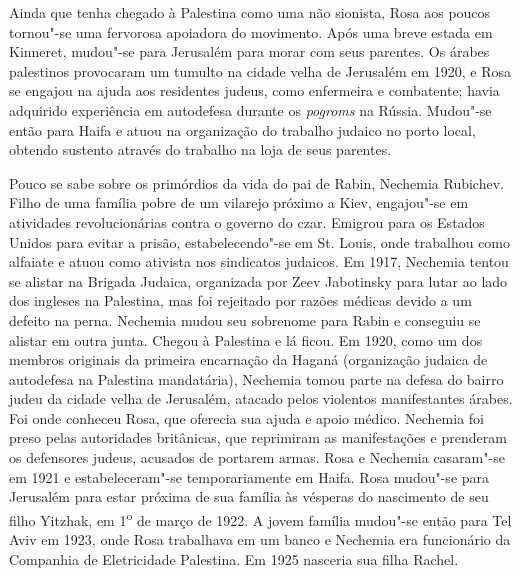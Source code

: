 Ainda que tenha chegado à Palestina como uma não sionista, Rosa aos
poucos tornou"-se uma fervorosa apoiadora do movimento. Após uma breve
estada em Kinneret, mudou"-se para Jerusalém para morar com seus
parentes. Os árabes palestinos provocaram um tumulto na cidade velha de
Jerusalém em 1920, e Rosa se engajou na ajuda aos residentes judeus, como
enfermeira e combatente; havia adquirido experiência em autodefesa
durante os \textit{pogroms} na Rússia. Mudou"-se então para Haifa e atuou
na organização do trabalho judaico no porto local, obtendo sustento
através do trabalho na loja de seus parentes.

Pouco se sabe sobre os primórdios da vida do pai de Rabin, Nechemia
Rubichev. Filho de uma família pobre de um vilarejo próximo a Kiev,
engajou"-se em atividades revolucionárias contra o governo do czar.
Emigrou para os Estados Unidos para evitar a prisão, estabelecendo"-se em
St. Louis, onde trabalhou como alfaiate e atuou como ativista nos
sindicatos judaicos. Em 1917, Nechemia tentou se alistar na Brigada
Judaica, organizada por Zeev Jabotinsky para lutar ao lado dos
ingleses na Palestina, mas foi rejeitado por razões médicas devido a um
defeito na perna. Nechemia mudou seu sobrenome para Rabin e conseguiu
se alistar em outra junta. Chegou à Palestina e lá ficou. Em 1920, como
um dos membros originais da primeira encarnação da Haganá (organização
judaica de autodefesa na Palestina mandatária), Nechemia tomou parte na
defesa do bairro judeu da cidade velha de Jerusalém, atacado pelos
violentos manifestantes árabes. Foi onde conheceu Rosa, que
oferecia sua ajuda e apoio médico. Nechemia foi preso pelas autoridades
britânicas, que reprimiram as manifestações e prenderam os defensores
judeus, acusados de portarem armas. Rosa e Nechemia casaram"-se em 1921 e
estabeleceram"-se temporariamente em Haifa. Rosa mudou"-se para Jerusalém
para estar próxima de sua família às vésperas do nascimento de seu filho
Yitzhak, em 1\textsuperscript{o} de março de 1922. A jovem família
mudou"-se então para Tel Aviv em 1923, onde Rosa trabalhava em um banco e
Nechemia era funcionário da Companhia de Eletricidade Palestina. Em 1925 nasceria
sua filha Rachel.

